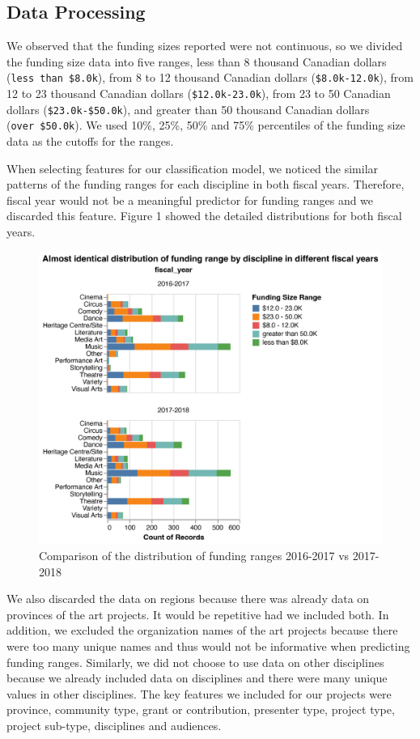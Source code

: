 \documentclass[
]{article}
\begin{document}
\hypertarget{data-processing}{%
\subsection{Data Processing}\label{data-processing}}

We observed that the funding sizes reported were not continuous, so we
divided the funding size data into five ranges, less than 8 thousand
Canadian dollars (\texttt{less\ than\ \$8.0k}), from 8 to 12 thousand
Canadian dollars (\texttt{\$8.0k-12.0k}), from 12 to 23 thousand
Canadian dollars (\texttt{\$12.0k-23.0k}), from 23 to 50 Canadian
dollars (\texttt{\$23.0k-\$50.0k}), and greater than 50 thousand
Canadian dollars (\texttt{over\ \$50.0k}). We used 10\%, 25\%, 50\% and
75\% percentiles of the funding size data as the cutoffs for the ranges.

When selecting features for our classification model, we noticed the
similar patterns of the funding ranges for each discipline in both
fiscal years. Therefore, fiscal year would not be a meaningful predictor
for funding ranges and we discarded this feature. Figure 1 showed the
detailed distributions for both fiscal years.

\begin{figure}

{\centering \includegraphics[width=0.7\linewidth]{../results/Funding_year} 

}

\caption{Comparison of the distribution of funding ranges 2016-2017 vs 2017-2018}\label{fig:drop-fiscal-year}
\end{figure}

We also discarded the data on regions because there was already data on
provinces of the art projects. It would be repetitive had we included
both. In addition, we excluded the organization names of the art
projects because there were too many unique names and thus would not be
informative when predicting funding ranges. Similarly, we did not choose
to use data on other disciplines because we already included data on
disciplines and there were many unique values in other disciplines. The
key features we included for our projects were province, community type,
grant or contribution, presenter type, project type, project sub-type,
disciplines and audiences.
\end{document}
